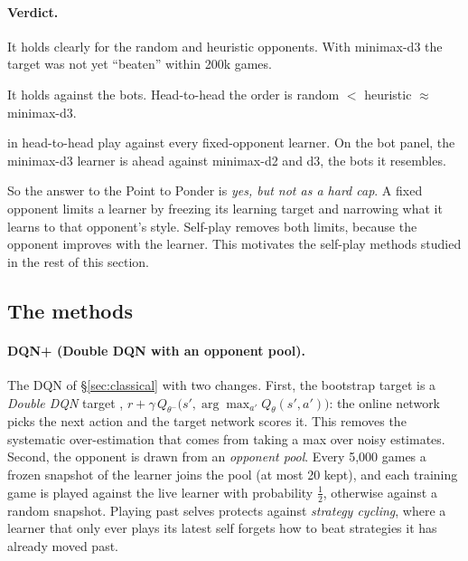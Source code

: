\documentclass[11pt]{article}
\begin{document}
\paragraph{Verdict.}
\begin{description}[leftmargin=1.2em,style=nextline,itemsep=2pt]
  \item[(a) Frozen target: supported.] It holds clearly for the random and
        heuristic opponents. With minimax-d3 the target was not yet ``beaten''
        within 200k games.
  \item[(b) Ordering: partly supported.] It holds against the bots. Head-to-head
        the order is random $<$ heuristic $\approx$ minimax-d3.
  \item[(c) Self-play: supported] in head-to-head play against every
        fixed-opponent learner. On the bot panel, the minimax-d3 learner is
        ahead against minimax-d2 and d3, the bots it resembles.
\end{description}
\noindent So the answer to the Point to Ponder is \emph{yes, but not as a hard
cap}. A fixed opponent limits a learner by freezing its learning target and
narrowing what it learns to that opponent's style. Self-play removes both
limits, because the opponent improves with the learner. This motivates the
self-play methods studied in the rest of this section.

\subsection{The methods}

\paragraph{DQN+ (Double DQN with an opponent pool).} The DQN of
\S\ref{sec:classical} with two changes. First, the bootstrap target is a
\emph{Double DQN} target \cite{vanhasselt2016},
$r + \gamma\,Q_{\theta^-}\!\big(s',\arg\max_{a'} Q_\theta(s',a')\big)$: the online
network picks the next action and the target network scores it. This removes
the systematic over-estimation that comes from taking a max over noisy
estimates. Second, the opponent is drawn from an \emph{opponent pool}. Every
5{,}000 games a frozen snapshot of the learner joins the pool (at most 20 kept),
and each training game is played against the live learner with probability
$\tfrac12$, otherwise against a random snapshot. Playing past selves protects
against \emph{strategy cycling}, where a learner that only ever plays its latest
self forgets how to beat strategies it has already moved past.
\end{document}

